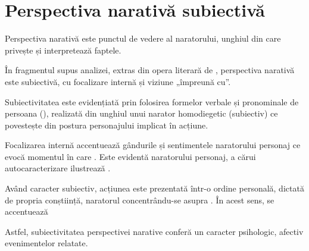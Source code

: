 \section{Perspectiva narativă subiectivă}

Perspectiva narativă este punctul de vedere al naratorului, unghiul din care privește și interpretează faptele.

În fragmentul supus analizei, extras din opera literară  de , perspectiva narativă este subiectivă, cu focalizare internă și viziune „împreună cu”.

Subiectivitatea este evidențiată prin folosirea formelor verbale și pronominale de persoana  (), realizată din unghiul unui narator homodiegetic (subiectiv) ce povestește din postura personajului implicat în acțiune.

Focalizarea internă accentuează gândurile și sentimentele naratorului personaj ce evocă momentul în care . Este evidentă  naratorului personaj, a cărui autocaracterizare ilustrează .

Având caracter subiectiv, acțiunea este prezentată într-o ordine personală, dictată de propria conștiință, naratorul concentrându-se asupra . În acest sens, se accentuează 

Astfel, subiectivitatea perspectivei narative conferă un caracter psihologic, afectiv evenimentelor relatate.
